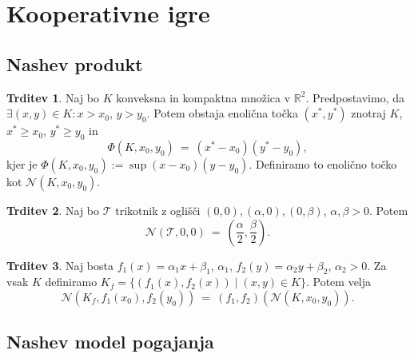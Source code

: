 \documentclass[11pt]{article}
\newcommand{\R}{\mathbb{R}}
\newcommand{\N}{\mathbb{N}}
\newcommand{\set}[1]{\{#1\}}
\newcommand{\oklepaj}[1]{\left(#1\right)}
\newcommand{\TT}{\mathcal{T}}
\newcommand{\1}{\mathbbm{1}}
\renewcommand{\N}{\mathcal{N}}
\theoremstyle{definition}
\theoremstyle{definition}
\newtheorem{trditev}{Trditev}[section]
\theoremstyle{definition}
\theoremstyle{definition}
\begin{document}
\section{Kooperativne igre}
\vspace{0.5cm}


\subsection{Nashev produkt}
\vspace{0.5cm}

\begin{trditev}

Naj bo $K$ konveksna in kompaktna množica v $\R^2$. Predpostavimo, da $\exists (x,y) \in K: x>x_0$, $y>y_0$. Potem obstaja enolična točka $(x^*,y^*)$ znotraj $K$, $x^* \geq x_0$, $y^* \geq y_0$ in
$$\Phi(K,x_0,y_0) ~=~ (x^*-x_0)(y^*-y_0),$$
kjer je $\Phi(K,x_0,y_0):=\sup(x-x_0)(y-y_0)$. Definiramo to enolično točko kot $\N(K,x_0,y_0)$.

\end{trditev}
\vspace{0.5cm}

\begin{trditev}

Naj bo $\TT$ trikotnik z oglišči $(0,0),(\alpha,0),(0,\beta)$, $\alpha,\beta>0$. Potem
$$\N(\TT,0,0) ~=~ \oklepaj{\frac{\alpha}{2},\frac{\beta}{2}}.$$

\end{trditev}
\vspace{0.5cm}

\begin{trditev}

Naj bosta $f_1(x) = \alpha_1 x + \beta_1$, $\alpha_1$, $f_2(y) = \alpha_2 y + \beta_2$, $\alpha_2 > 0$. Za vsak $K$ definiramo $K_f = \set{\oklepaj{f_1(x),f_2(x)} \mid (x,y)\in K}$. Potem velja
$$\N\oklepaj{K_f, f_1(x_0), f_2(y_0)} ~=~ (f_1,f_2)\oklepaj{\N(K,x_0,y_0)}.$$

\end{trditev}
\vspace{0.5cm}


\subsection{Nashev model pogajanja}
\vspace{0.5cm}
\end{document}
